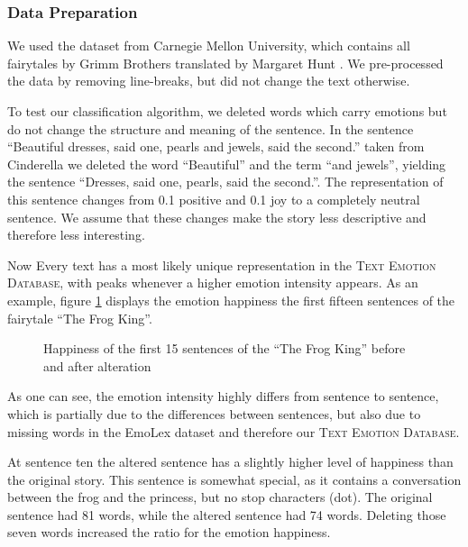 \documentclass[letterpaper]{article}
\begin{document}
\subsubsection{Data Preparation}
We used the dataset from Carnegie Mellon University, which contains all fairytales by Grimm Brothers translated by Margaret Hunt \cite{carnegiemellonuniversity}. We pre-processed the data by removing line-breaks, but did not change the text otherwise. 

To test our classification algorithm, we deleted words which carry emotions but do not change the structure and meaning of the sentence. In the sentence ``Beautiful dresses, said one, pearls and jewels, said the second.'' taken from Cinderella we deleted the word ``Beautiful'' and the term ``and jewels'', yielding the sentence ``Dresses, said one, pearls, said the second.''. The representation of this sentence changes from 0.1 positive and 0.1 joy to a completely neutral sentence. We assume that these changes make the story less descriptive and therefore less interesting. 

Now Every text has a most likely unique representation in the \textsc{Text Emotion Database}, with peaks whenever a higher emotion intensity appears. As an example, figure \ref{figure:sent11} displays the emotion happiness the first fifteen sentences of the fairytale ``The Frog King''. 

\begin{figure}[thpb]
      \centering
      \caption{Happiness of the first 15 sentences of the ``The Frog King'' before and after alteration}
      \label{figure:sent11}
   \end{figure}

As one can see, the emotion intensity highly differs from sentence to sentence, which is partially due to the differences between sentences, but also due to missing words in the EmoLex dataset and therefore our \textsc{Text Emotion Database}. 

At sentence ten the altered sentence has a slightly higher level of happiness than the original story. This sentence is somewhat special, as it contains a conversation between the frog and the princess, but no stop characters (dot). The original sentence had 81 words, while the altered sentence had 74 words. Deleting those seven words increased the ratio for the emotion happiness. 
\end{document}
